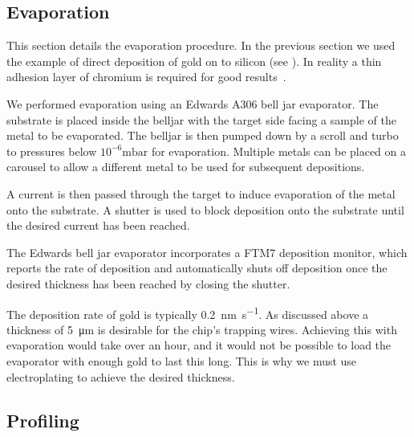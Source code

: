 \subsection{Evaporation}
\label{fab:evap}

This section details the evaporation procedure. In the previous section we used
the example of direct deposition of gold on to silicon (see
). In reality a thin adhesion layer of chromium
is required for good results~\cite{Madou2002}.

We performed evaporation using an Edwards A306 bell jar evaporator.  The
substrate is placed inside the belljar with the target side facing a sample of
the metal to be evaporated. The belljar is then pumped down by a scroll and
turbo to pressures below $10^{-6}\si{\milli\bar}$ for evaporation. Multiple
metals can be placed on a carousel to allow a different metal to be used for
subsequent depositions.


A current is then passed through the target to induce evaporation of the metal
onto the substrate. A shutter is used to block deposition onto the substrate
until the desired current has been reached.

The Edwards bell jar evaporator incorporates a FTM7 deposition monitor, which
reports the rate of deposition and automatically shuts off deposition once the
desired thickness has been reached by closing the shutter. 

The deposition rate of gold is typically \SI{0.2}{\nano\meter\per\second}.
%
%
As discussed above a thickness of \SI{5}{\micro\meter} is desirable for the
chip's trapping wires. Achieving this with evaporation would take over an hour,
and it would not be possible to load the evaporator with enough gold to last
this long. This is why we must use electroplating to achieve the desired
thickness.

\subsection{Profiling}
\label{fab:profile}


